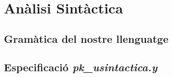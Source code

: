 \section{Anàlisi Sintàctica}

\subsection{Gramàtica del nostre llenguatge}

\newpage

\subsection{Especificació \emph{pk\_usintactica.y}}

\newpage
